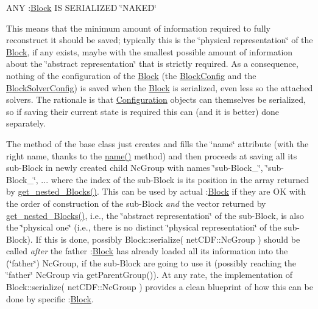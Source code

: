 \begin{DoxyItemize}
\item A\+NY \+:\mbox{\hyperlink{class_s_m_spp__di__unipi__it_1_1_block}{Block}} IS S\+E\+R\+I\+A\+L\+I\+Z\+ED \char`\"{}\+N\+A\+K\+E\+D\char`\"{}

This means that the minimum amount of information required to fully reconstruct it should be saved; typically this is the \char`\"{}physical
  representation\char`\"{} of the \mbox{\hyperlink{class_s_m_spp__di__unipi__it_1_1_block}{Block}}, if any exists, maybe with the smallest possible amount of information about the \char`\"{}abstract representation\char`\"{} that is strictly required. As a consequence, nothing of the configuration of the \mbox{\hyperlink{class_s_m_spp__di__unipi__it_1_1_block}{Block}} (the \mbox{\hyperlink{class_s_m_spp__di__unipi__it_1_1_block_config}{Block\+Config}} and the \mbox{\hyperlink{class_s_m_spp__di__unipi__it_1_1_block_solver_config}{Block\+Solver\+Config}}) is saved when the \mbox{\hyperlink{class_s_m_spp__di__unipi__it_1_1_block}{Block}} is serialized, even less so the attached solvers. The rationale is that \mbox{\hyperlink{class_s_m_spp__di__unipi__it_1_1_configuration}{Configuration}} objects can themselves be serialized, so if saving their current state is required this can (and it is better) done separately.
\end{DoxyItemize}

The method of the base class just creates and fills the \char`\"{}name\char`\"{} attribute (with the right name, thanks to the \mbox{\hyperlink{class_s_m_spp__di__unipi__it_1_1_block_a738e9dfd6e00507da219e4bd5a3f6be9}{name()}} method) and then proceeds at saving all its sub-\/\+Block in newly created child Nc\+Group with names \char`\"{}sub-\/\+Block\+\_\char`\"{}, \char`\"{}sub-\/\+Block\+\_\char`\"{}, ... where the index of the sub-\/\+Block is its position in the array returned by \mbox{\hyperlink{class_s_m_spp__di__unipi__it_1_1_block_a39bc932e28075740f08b392830a67e03}{get\+\_\+nested\+\_\+\+Blocks()}}. This can be used by actual \+:\mbox{\hyperlink{class_s_m_spp__di__unipi__it_1_1_block}{Block}} if they are OK with the order of construction of the sub-\/\+Block {\itshape and} the vector returned by \mbox{\hyperlink{class_s_m_spp__di__unipi__it_1_1_block_a39bc932e28075740f08b392830a67e03}{get\+\_\+nested\+\_\+\+Blocks()}}, i.\+e., the \char`\"{}abstract representation\char`\"{} of the sub-\/\+Block, is also the \char`\"{}physical one\char`\"{} (i.\+e., there is no distinct \char`\"{}physical representation\char`\"{} of the sub-\/\+Block). If this is done, possibly Block\+::serialize( net\+C\+D\+F\+::\+Nc\+Group ) should be called {\itshape after} the father \+:\mbox{\hyperlink{class_s_m_spp__di__unipi__it_1_1_block}{Block}} has already loaded all its information into the (\char`\"{}father\char`\"{}) Nc\+Group, if the sub-\/\+Block are going to use it (possibly reaching the \char`\"{}father\char`\"{} Nc\+Group via get\+Parent\+Group()). At any rate, the implementation of Block\+::serialize( net\+C\+D\+F\+::\+Nc\+Group ) provides a clean blueprint of how this can be done by specific \+:\mbox{\hyperlink{class_s_m_spp__di__unipi__it_1_1_block}{Block}}. 

